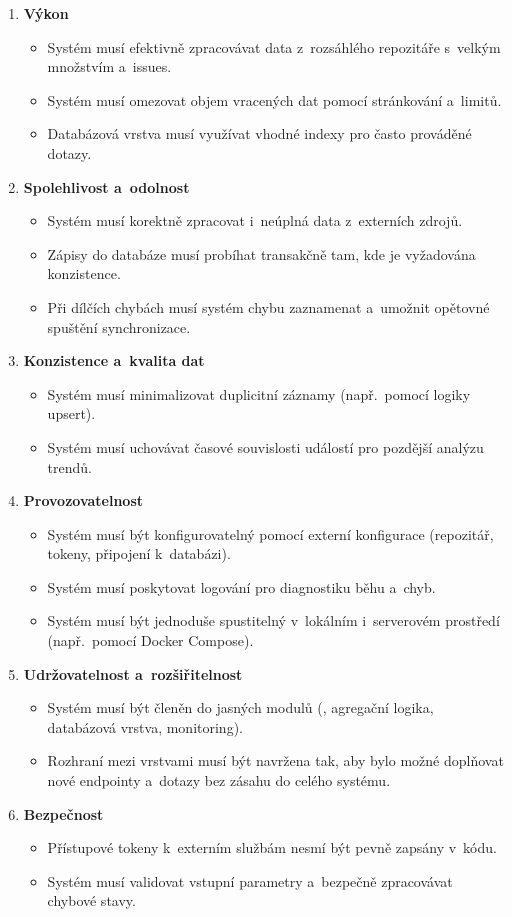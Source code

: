 \begin{enumerate}
  \item \textbf{Výkon}
    \begin{itemize}
      \item Systém musí efektivně zpracovávat data z~rozsáhlého repozitáře s~velkým množstvím \PR a~issues.
      \item Systém musí omezovat objem vracených dat pomocí stránkování a~limitů.
      \item Databázová vrstva musí využívat vhodné indexy pro často prováděné dotazy.
    \end{itemize}

  \item \textbf{Spolehlivost a~odolnost}
    \begin{itemize}
      \item Systém musí korektně zpracovat i~neúplná data z~externích zdrojů.
      \item Zápisy do databáze musí probíhat transakčně tam, kde je vyžadována konzistence.
      \item Při dílčích chybách musí systém chybu zaznamenat a~umožnit opětovné spuštění synchronizace.
    \end{itemize}

  \item \textbf{Konzistence a~kvalita dat}
    \begin{itemize}
      \item Systém musí minimalizovat duplicitní záznamy (např.\ pomocí logiky upsert).
      \item Systém musí uchovávat časové souvislosti událostí pro pozdější analýzu trendů.
    \end{itemize}

  \item \textbf{Provozovatelnost}
    \begin{itemize}
      \item Systém musí být konfigurovatelný pomocí externí konfigurace (repozitář, tokeny, připojení k~databázi).
      \item Systém musí poskytovat logování pro diagnostiku běhu a~chyb.
      \item Systém musí být jednoduše spustitelný v~lokálním i~serverovém prostředí (např.\ pomocí Docker Compose).
    \end{itemize}

  \item \textbf{Udržovatelnost a~rozšiřitelnost}
    \begin{itemize}
      \item Systém musí být členěn do jasných modulů (\API, agregační logika, databázová vrstva, monitoring).
      \item Rozhraní mezi vrstvami musí být navržena tak, aby bylo možné doplňovat nové endpointy a~dotazy bez zásahu do celého systému.
    \end{itemize}

  \item \textbf{Bezpečnost}
    \begin{itemize}
      \item Přístupové tokeny k~externím službám nesmí být pevně zapsány v~kódu.
      \item Systém musí validovat vstupní parametry \API a~bezpečně zpracovávat chybové stavy.
    \end{itemize}
\end{enumerate}

